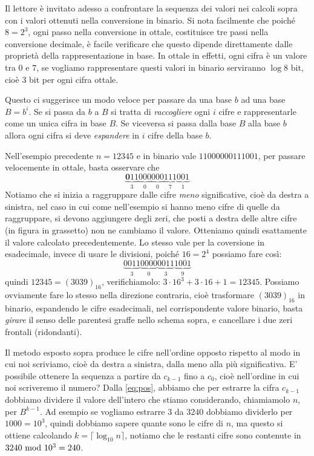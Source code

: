 Il lettore è invitato adesso a confrontare la sequenza dei valori nei calcoli sopra con i valori ottenuti nella conversione in binario. Si nota facilmente che poiché $8 = 2^3$, ogni passo nella conversione in ottale, costituisce tre passi nella conversione decimale, è facile verificare che questo dipende direttamente dalle proprietà della rappresentazione in base. In ottale in effetti, ogni cifra è un valore tra $0$ e $7$, se vogliamo rappresentare questi valori in binario serviranno $\log 8$ bit, cioè $3$ bit per ogni cifra ottale.

Questo ci suggerisce un modo veloce per passare da una base $b$ ad una base $B=b^i$. Se si passa da $b$ a $B$ si tratta di \emph{raccogliere} ogni $i$ cifre e rappresentarle come un unica cifra in base $B$. Se viceversa si passa dalla base $B$ alla base $b$ allora ogni cifra si deve \emph{espandere} in $i$
cifre della base $b$.

\begin{ex}
Nell'esempio precedente $n=12345$ e in binario vale $11000000111001$, per passare velocemente in ottale, basta osservare che
\[
\underbrace{\mathbf{0}11}_{3}\underbrace{000}_{0}\underbrace{000}_{0}\underbrace{111}_{7}\underbrace{001}_{1}
\]
\noindent Notiamo che si inizia a raggruppare dalle cifre \emph{meno} significative, cioè da destra a sinistra, nel caso in cui come nell'esempio si hanno meno cifre di quelle da raggruppare, si devono aggiungere degli zeri, che posti a destra delle altre cifre (in figura in grassetto) non ne cambiamo il valore. Otteniamo
quindi esattamente il valore calcolato precedentemente. Lo stesso vale per la coversione in esadecimale, invece di usare le divisioni, poiché $16 = 2^4$ possiamo fare così:
\[
\underbrace{0011}_{3}\underbrace{0000}_{0}\underbrace{0011}_{3}\underbrace{1001}_{9}
\]
quindi $12345 = (3039)_{16}$, verifichiamolo: $3\cdot{16}^3+3\cdot{16}+1 = 12345$. Possiamo ovviamente fare lo stesso nella direzione contraria, cioè trasformare $(3039)_{16}$ in binario, espandendo le cifre esadecimali, nel corrispondente valore binario, basta \emph{girare} il senso delle parentesi graffe nello schema sopra, e cancellare i due zeri frontali (ridondanti).
\end{ex}

Il metodo esposto sopra produce le cifre nell'ordine opposto rispetto al modo in cui noi scriviamo,  
cioè da destra a sinistra, dalla meno alla più significativa. E' possibile ottenere la sequenza a partire da $c_{k-1}$ fino
a $c_0$, cioè nell'ordine in cui noi scriveremo il numero? Dalla \eqref{eq:pos},
abbiamo che per estrarre la cifra $c_{k-1}$ dobbiamo dividere il valore dell'intero che stiamo considerando, chiamiamolo $n$, per $B^{k-1}$. Ad esempio
se vogliamo estrarre $3$ da $3240$ dobbiamo dividerlo per $1000 = 10^3$, quindi dobbiamo sapere quante sono le cifre di $n$, ma questo si ottiene calcolando
$k = \lceil \log_{10} n \rceil$, notiamo che le restanti cifre sono contenute in $3240 \ \text{mod}\ 10^3 = 240$.

